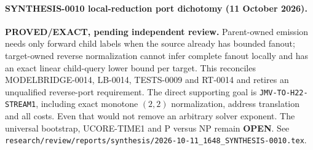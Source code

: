 \paragraph{SYNTHESIS-0010 local-reduction port dichotomy (11 October 2026).}
\textbf{PROVED/EXACT, pending independent review.}
Parent-owned emission needs only forward child labels when the source already
has bounded fanout; target-owned reverse normalization cannot infer complete
fanout locally and has an exact linear child-query lower bound per target.
This reconciles MODELBRIDGE-0014, LB-0014, TESTS-0009 and RT-0014 and retires
an unqualified reverse-port requirement.  The direct supporting goal is
\texttt{JMV-TO-H22-STREAM1}, including exact monotone $(2,2)$ normalization,
address translation and all costs.  Even that would not remove an arbitrary
solver exponent.  The universal bootstrap, UCORE-TIME1 and P versus NP
remain \textbf{OPEN}.  See
\texttt{research/review/reports/synthesis/2026-10-11\_1648\_SYNTHESIS-0010.tex}.
